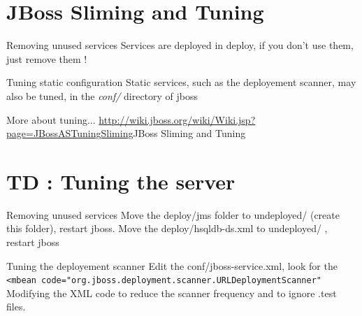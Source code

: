 \documentclass[handout]{beamer}
\begin{document}
\section{JBoss Sliming and Tuning}
	\begin{frame}
		\begin{block}{Removing unused services}
			Services are deployed in deploy, if you don't use them, just remove them !
		\end{block}
		\begin{block}{Tuning static configuration}
			Static services, such as the deployement scanner, may also be tuned, in the \textit{conf/} directory of jboss
		\end{block}
		\begin{block}{More about tuning...}
			\url{http://wiki.jboss.org/wiki/Wiki.jsp?page=JBossASTuningSliming}{JBoss Sliming and Tuning}
		\end{block}

	\end{frame}
\section{TD : Tuning the server}
	\begin{frame}
		\begin{block}{Removing unused services}
			Move the deploy/jms folder to undeployed/ (create this folder), restart jboss.
			Move the deploy/hsqldb-ds.xml to undeployed/ , restart jboss
		\end{block}		
		\begin{block}{Tuning the deployement scanner}
			Edit the conf/jboss-service.xml, look for the \texttt{<mbean code="org.jboss.deployment.scanner.URLDeploymentScanner"}
			Modifying the XML code to reduce the scanner frequency and to ignore .test files.
		\end{block}		
	\end{frame}
\end{document}
